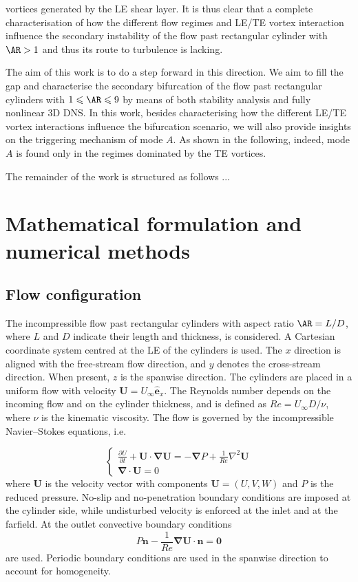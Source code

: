 \documentclass{jfm}
\begin{document}
vortices generated by the LE shear layer. It is thus clear that a complete characterisation of how the different flow regimes and LE/TE vortex interaction influence the secondary instability of the flow past rectangular cylinder with $\AR>1$ and thus its route to turbulence is lacking.
    
The aim of this work is to do a step forward in this direction. We aim to fill the gap and characterise the secondary bifurcation of the flow past rectangular cylinders with $1 \le \AR \le 9$ by means of both stability analysis and fully nonlinear 3D DNS. In this work, besides characterising how the different LE/TE vortex interactions influence the bifurcation scenario, we will also provide insights on the triggering mechanism of mode $A$. As shown in the following, indeed, mode $A$ is found only in the regimes dominated by the TE vortices. 
  
The remainder of the work is structured as follows ...
  
\section{Mathematical formulation and numerical methods}
\label{sec:methods}

\subsection{Flow configuration}
The incompressible flow past rectangular cylinders with aspect ratio $\AR=L/D$, where $L$ and $D$ indicate their length and thickness, is considered. A Cartesian coordinate system centred at the LE of the cylinders is used. The $x$ direction is aligned with the free-stream flow direction, and $y$ denotes the cross-stream direction. When present, $z$ is the spanwise direction. The cylinders are placed in a uniform flow with velocity $\bm{U}=U_\infty\hat{\bm{e}}_x$. The Reynolds number depends on the incoming flow and on the cylinder thickness, and is defined as $Re= U_\infty D /\nu$, where $\nu$ is the kinematic viscosity. The flow is governed by the incompressible Navier--Stokes equations, i.e.
%

\begin{equation}
\begin{cases}
\frac{\partial U}{\partial t} + \bm{U} \cdot \bm{\nabla}\bm{U} = - \bm{\nabla} P + \frac{1}{Re} \nabla^2 \bm{U} \\
\bm{\nabla} \cdot \bm{U} = 0
\end{cases}
\label{eq:NSequations}
\end{equation}
%
where $\bm{U}$ is the velocity vector with components $\bm{U}=(U,V,W)$ and $P$ is the reduced pressure. No-slip and no-penetration boundary conditions are imposed at the cylinder side, while undisturbed velocity is enforced at the inlet and at the farfield. At the outlet convective boundary conditions
% 
\begin{equation*}
P \bm{n} - \frac{1}{Re} \bm{\nabla} \bm{U} \cdot \bm{n} = \bm{0}
\end{equation*}
%
are used. Periodic boundary conditions are used in the spanwise direction to account for homogeneity.
\end{document}
